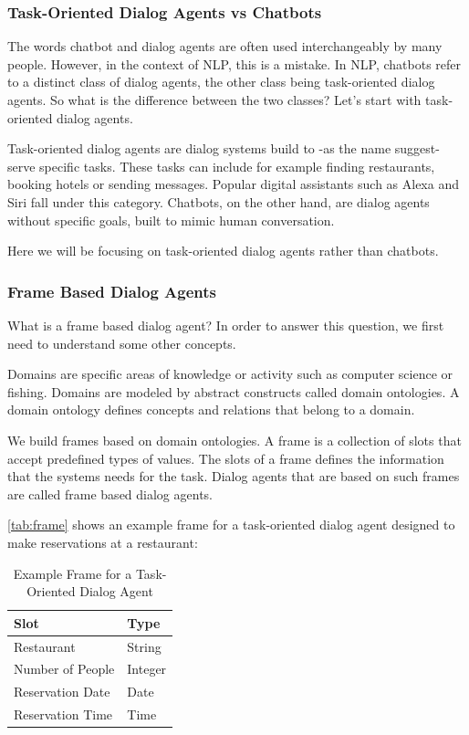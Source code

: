 \subsubsection{Task-Oriented Dialog Agents vs Chatbots}
The words chatbot and dialog agents are often used interchangeably by many people.
However, in the context of NLP, this is a mistake.
In NLP, chatbots refer to a distinct class of dialog agents, the other class being task-oriented dialog agents.
So what is the difference between the two classes? 
Let's start with task-oriented dialog agents.

Task-oriented dialog agents are dialog systems build to -as the name suggest- serve specific tasks.
These tasks can include for example finding restaurants, booking hotels or sending messages.
Popular digital assistants such as Alexa and Siri fall under this category.
Chatbots, on the other hand, are dialog agents without specific goals, built to mimic human conversation.

Here we will be focusing on task-oriented dialog agents rather than chatbots.

\subsubsection{Frame Based Dialog Agents}
What is a frame based dialog agent?
In order to answer this question, we first need to understand some other concepts.

Domains are specific areas of knowledge or activity such as computer science or fishing.
Domains are modeled by abstract constructs called domain ontologies.
A domain ontology defines concepts and relations that belong to a domain.

We build frames based on domain ontologies.
A frame is a collection of slots that accept predefined types of values.
The slots of a frame defines the information that the systems needs for the task.
Dialog agents that are based on such frames are called frame based dialog agents.

\autoref{tab:frame} shows an example frame for a task-oriented dialog agent designed to make reservations at a restaurant:

\begin{table}[htbp]
  \caption[Example Frame for a Task-Oriented Dialog Agent]{Example Frame for a Task-Oriented Dialog Agent}\label{tab:frame}
  \centering
  \begin{tabular}{l|l}
    Slot&Type\\ \toprule
    Restaurant&String\\ \hline
    Number of People&Integer\\ \hline
    Reservation Date&Date\\ \hline
    Reservation Time&Time\\ \hline
  \end{tabular}
\end{table}

